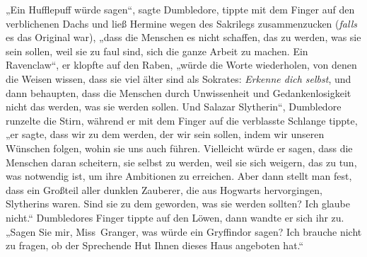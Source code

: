 „Ein Hufflepuff würde sagen“, sagte Dumbledore, tippte mit dem Finger auf den verblichenen Dachs und ließ Hermine wegen des Sakrilegs zusammenzucken (\emph{falls} es das Original war), „dass die Menschen es nicht schaffen, das zu werden, was sie sein sollen, weil sie zu faul sind, sich die ganze Arbeit zu machen. Ein Ravenclaw“, er klopfte auf den Raben, „würde die Worte wiederholen, von denen die Weisen wissen, dass sie viel älter sind als Sokrates: \emph{Erkenne dich selbst}, und dann behaupten, dass die Menschen durch Unwissenheit und Gedankenlosigkeit nicht das werden, was sie werden sollen. Und Salazar Slytherin“, Dumbledore runzelte die Stirn, während er mit dem Finger auf die verblasste Schlange tippte, „er sagte, dass wir zu dem werden, der wir sein sollen, indem wir unseren Wünschen folgen, wohin sie uns auch führen. Vielleicht würde er sagen, dass die Menschen daran scheitern, sie selbst zu werden, weil sie sich weigern, das zu tun, was notwendig ist, um ihre Ambitionen zu erreichen. Aber dann stellt man fest, dass ein Großteil aller dunklen Zauberer, die aus Hogwarts hervorgingen, Slytherins waren. Sind sie zu dem geworden, was sie werden sollten? Ich glaube nicht.“ Dumbledores Finger tippte auf den Löwen, dann wandte er sich ihr zu. „Sagen Sie mir, Miss~Granger, was würde ein Gryffindor sagen? Ich brauche nicht zu fragen, ob der Sprechende Hut Ihnen dieses Haus angeboten hat.“

